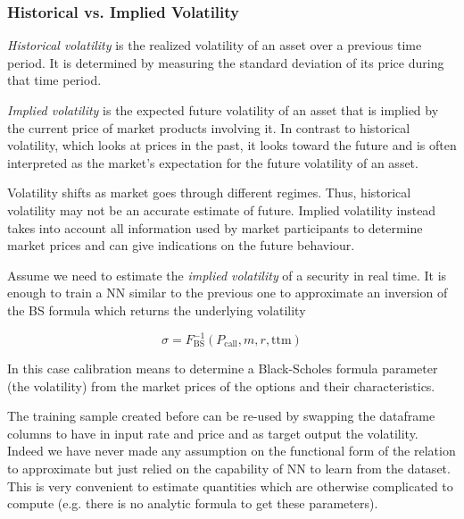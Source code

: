 \begin{attention}
\subsubsection{Historical vs. Implied Volatility}
\label{historical-vs.-implied-volatility}
	
\emph{Historical volatility} is the realized volatility of an asset over a previous time period. It is determined by measuring the standard deviation of its price during that time period.
	
\emph{Implied volatility} is the expected future volatility of an asset that is implied by the current price of market products involving it.
In contrast to historical volatility, which looks at prices in the past, it looks toward the future and is often interpreted as the market's expectation for the future volatility of an asset.
	
Volatility shifts as market goes through different regimes. Thus, historical volatility may not be an accurate estimate of future. Implied volatility instead takes into account all information used by market participants to determine market prices and can give indications on the future behaviour.
\end{attention}

Assume we need to estimate the \emph{implied volatility} of a security in real time. It is enough to train a NN similar to the previous one to approximate an inversion of the BS formula which returns the underlying volatility

\begin{equation} 
	\sigma = F^{-1}_\textrm{BS}(P_\textrm{call}, m, r, \mathrm{ttm})
\end{equation}

In this case calibration means to determine a Black-Scholes formula parameter (the volatility) from the market prices of the options and their characteristics.

The training sample created before can be re-used by swapping the dataframe columns to have in input rate and price and as target output the volatility. 
Indeed we have never made any assumption on the functional form of the relation to approximate but just relied on the capability of NN to learn from the dataset.
This is very convenient to estimate quantities which are otherwise complicated to compute (e.g. there is no analytic formula to get these parameters).
 
